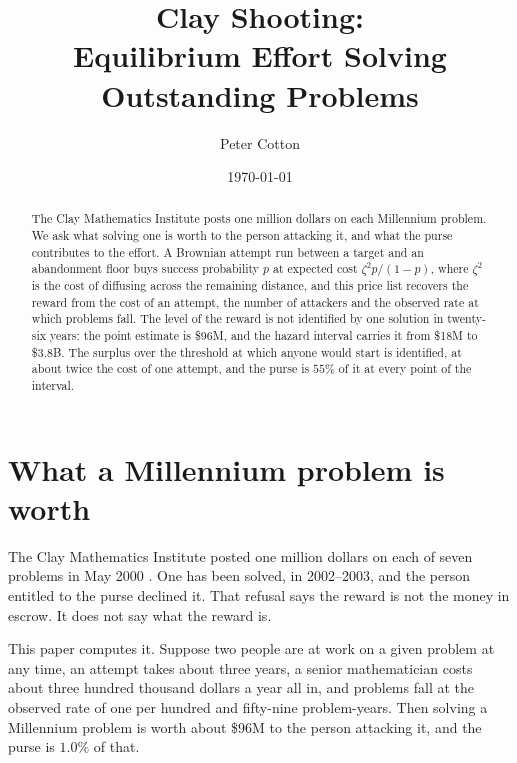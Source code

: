 \documentclass[11pt]{article}
\title{\textbf{Clay Shooting:\\ Equilibrium Effort Solving Outstanding Problems}}
\author{Peter Cotton}
\date{\today}
\theoremstyle{itheads}
\begin{document}
\maketitle

\begin{abstract}
\noindent The Clay Mathematics Institute posts one million dollars on each
Millennium problem. We ask what solving one is worth to the person
attacking it, and what the purse contributes to the effort. A Brownian
attempt run between a target and an abandonment floor buys success
probability $p$ at expected cost $\zeta^{2}p/(1-p)$, where $\zeta^{2}$ is
the cost of diffusing across the remaining distance, and this price list
recovers the reward from the cost of an attempt, the number of attackers
and the observed rate at which problems fall. The level of the reward is
not identified by one solution in twenty-six years: the point estimate is
\$96M, and the hazard interval carries it from \$18M to \$3.8B. The surplus
over the threshold at which anyone would start is identified, at about
twice the cost of one attempt, and the purse is $55\%$ of it at every
point of the interval.
\end{abstract}

\section{What a Millennium problem is worth}

The Clay Mathematics Institute posted one million dollars on each of seven
problems in May 2000 \citep{clay2000}. One has been solved, in 2002--2003,
and the person entitled to the purse declined it. That refusal says the
reward is not the money in escrow. It does not say what the reward is.

This paper computes it. Suppose two people are at work on a given problem
at any time, an attempt takes about three years, a senior mathematician
costs about three hundred thousand dollars a year all in, and problems fall
at the observed rate of one per hundred and fifty-nine problem-years. Then
solving a Millennium problem is worth about \$96M to the person attacking
it, and the purse is $1.0\%$ of that.
\end{document}
